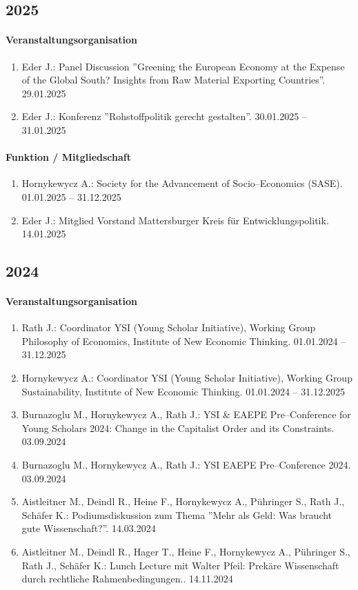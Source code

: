 
\subsection*{2025}
\paragraph{Veranstaltungsorganisation}
\begin{enumerate}[leftmargin=*, labelsep=0.5cm]
\item Eder J.: Panel Discussion ''Greening the European Economy at the Expense of the Global South? Insights from Raw Material Exporting Countries''. 29.01.2025
\item Eder J.: Konferenz ''Rohstoffpolitik gerecht gestalten''. 30.01.2025 -- 31.01.2025
\end{enumerate}

\paragraph{Funktion / Mitgliedschaft}
\begin{enumerate}[leftmargin=*, labelsep=0.5cm]
\item Hornykewycz A.: Society for the Advancement of Socio--Economics (SASE). 01.01.2025 -- 31.12.2025
\item Eder J.: Mitglied Vorstand Mattersburger Kreis für Entwicklungspolitik. 14.01.2025
\end{enumerate}
\subsection*{2024}
\paragraph{Veranstaltungsorganisation}
\begin{enumerate}[leftmargin=*, labelsep=0.5cm]
\item Rath J.: Coordinator YSI (Young Scholar Initiative), Working Group Philosophy of Economics,  Institute of New Economic Thinking. 01.01.2024 -- 31.12.2025
\item Hornykewycz A.: Coordinator YSI (Young Scholar Initiative), Working Group Sustainability, Institute of New Economic Thinking. 01.01.2024 -- 31.12.2025
\item Burnazoglu M., Hornykewycz A., Rath J.: YSI \& EAEPE Pre--Conference for Young Scholars 2024: Change in the Capitalist Order and its Constraints. 03.09.2024
\item Burnazoglu M., Hornykewycz A., Rath J.: YSI EAEPE Pre--Conference 2024. 03.09.2024
\item Aistleitner M., Deindl R., Heine F., Hornykewycz A., Pühringer S., Rath J., Schäfer K.: Podiumsdiskussion zum Thema ''Mehr als Geld: Was braucht gute Wissenschaft?''. 14.03.2024
\item Aistleitner M., Deindl R., Hager T., Heine F., Hornykewycz A., Pühringer S., Rath J., Schäfer K.: Lunch Lecture mit Walter Pfeil: Prekäre Wissenschaft durch rechtliche Rahmenbedingungen.. 14.11.2024
\end{enumerate}

